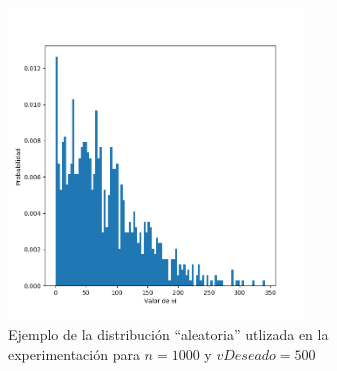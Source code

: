 \begin{figure}[H] 
    \centering
        \centering
        \includegraphics[width=0.7\textwidth]{img/distribucion.png} %
        \caption{Ejemplo de la distribuci\'on ``aleatoria'' utlizada en la experimentaci\'on para 
        $n = 1000$ y $vDeseado = 500$}
        \label{fig:tiempoBackDinamicavChico} 
\end{figure}